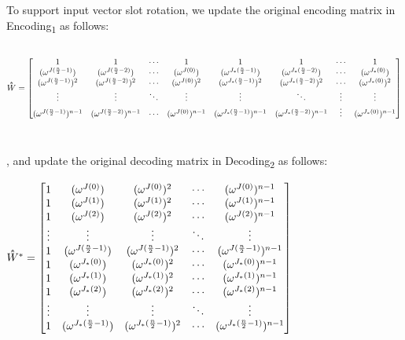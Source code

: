 \begin{tcolorbox}[title={\textbf{\tboxlabel{\ref*{subsec:bfv-rotation}} BFV's Homomorphic Rotation of Input Vector Slots}}]

To support input vector slot rotation, we update the original encoding matrix in \textsf{Encoding\textsubscript{1}} as follows: 

$ $

{\footnotesize{\noindent $\hathat{W} = \begin{bmatrix}
1 & 1 & \cdots & 1 & 1 & 1 & \cdots & 1\\
(\omega^{J(\frac{n}{2} - 1)}) & (\omega^{J(\frac{n}{2} - 2)}) & \cdots & (\omega^{J(0)}) & (\omega^{J_*(\frac{n}{2} - 1)}) & (\omega^{J_*(\frac{n}{2} - 2)}) & \cdots & (\omega^{J_*(0)})\\
(\omega^{J(\frac{n}{2} - 1)})^2 & (\omega^{J(\frac{n}{2} - 2)})^2 & \cdots & (\omega^{J(0)})^2 & (\omega^{J_*(\frac{n}{2} - 1)})^2 & (\omega^{J_*(\frac{n}{2} - 2)})^2 & \cdots & (\omega^{J_*(0)})^2 \\
\vdots & \vdots & \ddots & \vdots & \vdots & \ddots & \vdots & \vdots \\
(\omega^{J(\frac{n}{2} - 1)})^{n-1} & (\omega^{J(\frac{n}{2} - 2)})^{n-1} & \cdots & (\omega^{J(0)})^{n-1} & (\omega^{J_*(\frac{n}{2} - 1)})^{n-1} & (\omega^{J_*(\frac{n}{2} - 2)})^{n-1} & \vdots  & (\omega^{J_*(0)})^{n-1}
\end{bmatrix}$}}

$ $

$ $


, and update the original decoding matrix in \textsf{Decoding\textsubscript{2}} as follows:

$\hathat{W}^* = \begin{bmatrix}
1 & (\omega^{J(0)}) & (\omega^{J(0)})^2 & \cdots & (\omega^{J(0)})^{n-1}\\
1 & (\omega^{J(1)}) & (\omega^{J(1)})^2 & \cdots & (\omega^{J(1)})^{n-1}\\
1 & (\omega^{J(2)}) & (\omega^{J(2)})^2 & \cdots & (\omega^{J(2)})^{n-1}\\
\vdots & \vdots & \vdots & \ddots & \vdots \\
1 & (\omega^{J(\frac{n}{2}-1)}) & (\omega^{J(\frac{n}{2}-1)})^2 & \cdots & (\omega^{J(\frac{n}{2}-1)})^{n-1}\\
1 & (\omega^{J_*(0)}) & (\omega^{J_*(0)})^2 & \cdots & (\omega^{J_*(0)})^{n-1}\\
1 & (\omega^{J_*(1)}) & (\omega^{J_*(1)})^2 & \cdots & (\omega^{J_*(1)})^{n-1}\\
1 & (\omega^{J_*(2)}) & (\omega^{J_*(2)})^2 & \cdots & (\omega^{J_*(2)})^{n-1}\\
\vdots & \vdots & \vdots & \ddots & \vdots \\
1 & (\omega^{J_*(\frac{n}{2}-1)}) & (\omega^{J_*(\frac{n}{2}-1)})^2 & \cdots & (\omega^{J_*(\frac{n}{2}-1)})^{n-1}\\
\end{bmatrix}$


\end{tcolorbox}
